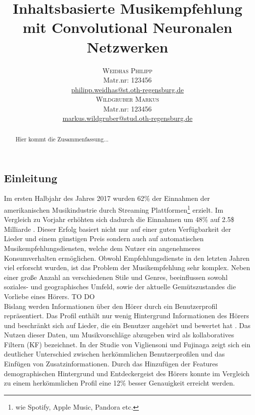 \documentclass[twosided,a4,10pt]{article}
\title{\vspace{-5mm}%
	\fontsize{20pt}{10pt}\selectfont
	\textbf{Inhaltsbasierte Musikempfehlung mit Convolutional Neuronalen Netzwerken}
}
\author{
	\large\begin{minipage}[t]{0.5\linewidth}
		\begin{center}
			\textsc{Weidhas Philipp}\\[2mm]
			\normalsize	Matr.nr: 123456\\
			\normalsize
			\href{mailto:philipp.weidhas@st.oth-regensburg.de}
			{philipp.weidhas@st.oth-regensburg.de}
		\end{center}
	\end{minipage}
	\begin{minipage}[t]{0.5\linewidth}
		\begin{center}
			\textsc{Wildgruber Markus}\\[2mm]
			\normalsize	Matr.nr: 123456\\
			\normalsize
			\href{mailto:markus.wildgruber@stud.oth-regensburg.de}
			{markus.wildgruber@stud.oth-regensburg.de}
		\end{center}
	\end{minipage}
}
\begin{document}
	
	\maketitle
	\thispagestyle{fancy}
	
	
	
	\begin{multicols}{2}
		
		\begin{abstract}
			\noindent Hier kommt die Zusammenfassung...
		\end{abstract}
		
		
		\section{Einleitung}
		
		Im ersten Halbjahr des Jahres 2017 wurden 62\% der Einnahmen der amerikanischen Musikindustrie durch Streaming Plattformen\footnote[1]{wie Spotify, Apple Music, Pandora etc.} erzielt. Im Vergleich zu Vorjahr erhöhten sich dadurch die Einnahmen um 48\% auf 2.5\$ Milliarde \cite{friedlander}. Dieser Erfolg basiert nicht nur auf einer guten Verfügbarkeit der Lieder und einem günstigen Preis sondern auch auf automatischen Musikempfehlungsdiensten, welche dem Nutzer ein angenehmeres Konsumverhalten ermöglichen.\newline
		Obwohl Empfehlungsdienste in den letzten Jahren viel erforscht wurden, ist das Problem der Musikempfehlung sehr komplex. Neben einer große Anzahl an verschiedenen Stile und Genres, beeinflussen sowohl soziales- und geographisches Umfeld, sowie der aktuelle Gemütszustandes die Vorliebe eines Hörers. \cite{oord}\newline
		TO DO \newline\\
		
		Bislang werden Informationen über den Hörer durch ein Benutzerprofil repräsentiert. Das Profil enthält nur wenig Hintergrund Informationen des Hörers und beschränkt sich auf Lieder, die ein Benutzer angehört und bewertet hat \cite{oord}. Das Nutzen dieser Daten, um Musikvorschläge abzugeben wird als kollaboratives Filtern (KF) bezeichnet. In der Studie von Vigliensoni und Fujinaga \cite{vigliensoni} zeigt sich ein deutlicher Unterschied zwischen herkömmlichen Benutzerprofilen und das Einfügen von Zusatzinformationen. Durch das Hinzufügen der Features demographischen Hintergrund und Entdeckergeist des Hörers konnte im Vergleich zu einem herkömmlichen Profil eine 12\% besser Genauigkeit erreicht werden.\newline\\
		

\end{multicols}
\end{document}
